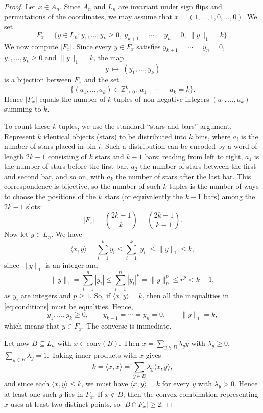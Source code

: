 \documentclass[11pt,a4paper]{article} %
\theoremstyle{definition}
\theoremstyle{remark}
\newcommand{\conv}{\mathrm{conv}}
\newcommand{\1}{\mathds{1}}
\begin{document}
\begin{proof}
    Let $x \in A_n$. Since $A_n$ and $L_n$ are invariant under sign flips and permutations of the coordinates, we may assume that $x=(1,\ldots,1,0,\ldots,0)$. We set $$F_x=\{ y \in L_n:y_1, \ldots,y_k \geq 0, \ y_{k+1}=\cdots = y_n=0, \ \|y\|_1=k\}.$$ 
    We now compute $|F_x|$. Since every $y\in F_x$ satisfies
$y_{k+1}=\cdots=y_n=0$, $y_1,\ldots,y_k\ge 0$ and $\|y\|_1=k$, the map
\[
y\ \longmapsto\ (y_1,\ldots,y_k)
\]
is a bijection between $F_x$ and the set
\[
\Big\{(a_1,\ldots,a_k)\in \mathbb{Z}_{\ge 0}^k:\ a_1+\cdots+a_k=k\Big\}.
\]
Hence $|F_x|$ equals the number of $k$-tuples of non-negative integers
$(a_1,\ldots,a_k)$ summing to $k$.

To count these $k$-tuples, we use the standard ``stars and bars'' argument.
Represent $k$ identical objects (stars) to be distributed into $k$ bins, where
$a_i$ is the number of stars placed in bin $i$. Such a distribution can be encoded
by a word of length $2k-1$ consisting of $k$ stars and $k-1$ bars: reading from left
to right, $a_1$ is the number of stars before the first bar, $a_2$ the number of stars
between the first and second bar, and so on, with $a_k$ the number of stars after the last bar.
This correspondence is bijective, so the number of such $k$-tuples is the number of ways to choose
the positions of the $k$ stars (or equivalently the $k-1$ bars) among the $2k-1$ slots:
\[
|F_x|
=\binom{2k-1}{k}
=\binom{2k-1}{k-1}.
\]
Now let $y \in L_n$. We have \begin{equation}\label{eq:conditions}  
    \langle x,y \rangle = \sum_{i=1}^{k}y_i \leq \sum_{i=1}^{k}|y_i| \leq \|y\|_1 \leq k,
    \end{equation} since $\|y\|_1$ is an integer and $$\|y\|_1=\sum_{i=1}^{n} |y_i| \leq \sum_{i=1}^{n}|y_i|^p=\|y\|_p^p \leq r^p<k+1,$$ as $y_i$ are integers and $p \geq 1$. So, if $\langle x,y \rangle=k$, then all the inequalities in \eqref{eq:conditions} must be equalities. Hence, $$y_1,\ldots,y_k \geq 0, \qquad y_{k+1}=\cdots=y_n=0, \qquad \|y\|_1=k,$$ which means that $y \in F_x$. The converse is immediate.

     Let now $B \subseteq L_n$ with $x \in \conv(B)$. Then $x=\sum_{y\in B}\lambda_y y$ with $\lambda_y\ge0$, $\sum_{y \in B}\lambda_y=1$.
Taking inner products with $x$ gives
\[
k=\langle x,x\rangle=\sum_{y\in B}\lambda_y\langle x,y\rangle,
\]
and since each $\langle x,y\rangle\le k$, we must have $\langle x,y\rangle=k$ for every $y$ with $\lambda_y>0$.
Hence at least one such $y$ lies in $F_{x}$.
If $x\notin B$, then the convex combination representing $x$ uses at least two distinct points, so $|B\cap F_{x}|\ge 2$.
\end{proof}
\end{document}
